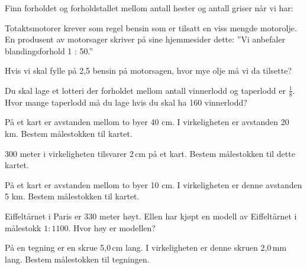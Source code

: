  \vs
{}

 \vs
{}

Finn forholdet og forholdstallet mellom antall hester og antall griser når vi har:\os
{}

Totaktsmotorer krever som regel bensin som er tilsatt en viss mengde motorolje. En produsent av motorsager skriver på sine hjemmesider dette: ''Vi anbefaler blandingsforhold 1 : 50.'' \os

Hvis vi skal fylle på 2,5 bensin på motorsagen, hvor mye olje må vi da tilsette?

Du skal lage et lotteri der forholdet mellom antall vinnerlodd og taperlodd er $ \frac{1}{8} $. Hvor mange taperlodd må du lage hvis du skal ha 160 vinnerlodd?

På et kart er avstanden mellom to byer 40 cm. I virkeligheten er avstanden 20 km.
Bestem målestokken til kartet.

300 meter i virkeligheten tilsvarer 2\,cm på et kart. Bestem målestokken til dette kartet.

På et kart er avstanden mellom to byer 10 cm. I virkeligheten er denne
avstanden 5 km.
Bestem målestokken til kartet.

Eiffeltårnet i Paris er 330 meter høyt.
Ellen har kjøpt en modell av Eiffeltårnet
i målestokk $1 : 1100$.
Hvor høy er modellen?

På en tegning er en skrue 5,0\,cm lang. I virkeligheten er denne skruen 2,0\,mm lang.
Bestem målestokken til tegningen.


